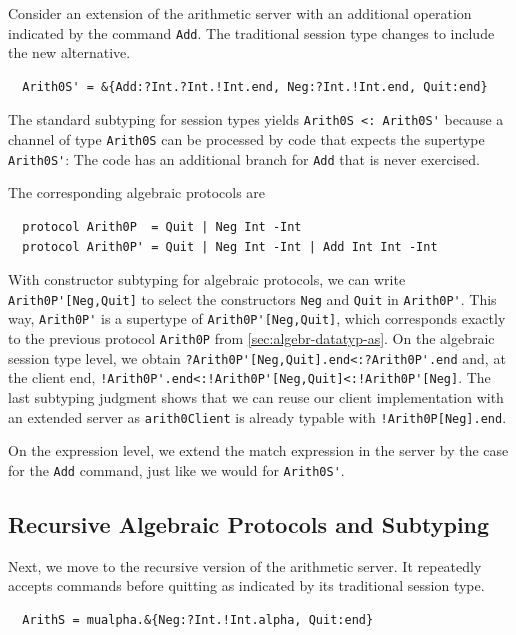 Consider an extension of the arithmetic server with an additional
operation indicated by the command \lstinline+Add+. The 
traditional session type changes to include the new alternative.
\begin{lstlisting}
  Arith0S' = &{Add:?Int.?Int.!Int.end, Neg:?Int.!Int.end, Quit:end}
\end{lstlisting}
The standard subtyping for session types yields
\lstinline+Arith0S <: Arith0S'+ because a channel of type
\lstinline+Arith0S+ can be processed by code that expects the supertype
\lstinline+Arith0S'+: The code has an additional branch for \lstinline+Add+ that is never
exercised.

The corresponding algebraic protocols are
\begin{lstlisting}
  protocol Arith0P  = Quit | Neg Int -Int
  protocol Arith0P' = Quit | Neg Int -Int | Add Int Int -Int
\end{lstlisting}
With constructor subtyping for algebraic protocols, we can write
\lstinline+Arith0P'[Neg,Quit]+ to select the
constructors \lstinline+Neg+ and \lstinline+Quit+ in
\lstinline+Arith0P'+. 
This way, \lstinline+Arith0P'+ is a supertype of 
\lstinline+Arith0P'[Neg,Quit]+, which corresponds exactly to the
previous protocol \lstinline+Arith0P+ from
\cref{sec:algebr-datatyp-as}.
On the algebraic session type level, we obtain
\lstinline+?Arith0P'[Neg,Quit].end<:?Arith0P'.end+ and, at the client
end,
\lstinline+!Arith0P'.end<:!Arith0P'[Neg,Quit]<:!Arith0P'[Neg]+. The
last subtyping judgment shows that we can reuse our client implementation
with an extended server as \lstinline+arith0Client+ is already typable with
\lstinline+!Arith0P[Neg].end+. 

On the expression level, we extend the match expression in the server
by the case for the \lstinline+Add+ command, just like we would for \lstinline+Arith0S'+.


\subsection{Recursive Algebraic Protocols and Subtyping}
\label{sec:recurs-algebr-prot}

Next, we move to the recursive
version of the arithmetic server. It repeatedly accepts commands
before quitting as indicated by its traditional session type.
\begin{lstlisting}
  ArithS = mualpha.&{Neg:?Int.!Int.alpha, Quit:end}
\end{lstlisting}

